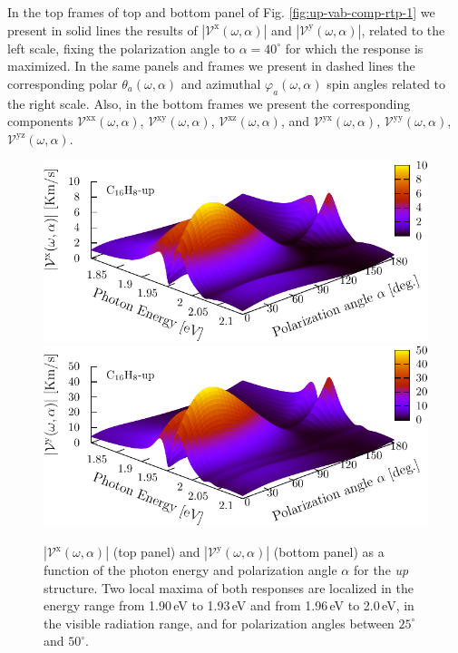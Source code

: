\documentclass[prb,11pt,tightenlines,twocolumn,aps]{revtex4-1}
\begin{document}
In the top frames of top and bottom panel of Fig. \ref{fig:up-vab-comp-rtp-1} we
present in solid lines the results of
$|\mathcal{V}^{\mathrm{x}}(\omega,\alpha)|$ and
$|\mathcal{V}^{\mathrm{y}}(\omega,\alpha)|$, related to the left scale, fixing
the polarization angle to $\alpha=40^{\circ}$ for which the response is
maximized. In the same panels and frames we present in dashed lines the
corresponding polar $\theta_{a}(\omega,\alpha)$ and azimuthal
$\varphi_{a}(\omega,\alpha)$ spin angles related to the right scale. Also, in
the bottom frames we present the corresponding components
$\mathcal{V}^{\mathrm{xx}}(\omega,\alpha)$,
$\mathcal{V}^{\mathrm{xy}}(\omega,\alpha)$,
$\mathcal{V}^{\mathrm{xz}}(\omega,\alpha)$, and
$\mathcal{V}^{\mathrm{yx}}(\omega,\alpha)$,
$\mathcal{V}^{\mathrm{yy}}(\omega,\alpha)$,
$\mathcal{V}^{\mathrm{yz}}(\omega,\alpha)$.
\begin{figure}[t]
    \centering
    \includegraphics[width=\linewidth]{upplots/up-3d-vxb-2}
    \\
    \includegraphics[width=\linewidth]{upplots/up-3d-vyb-2}
    
    \caption{$|\mathcal{V}^{\mathrm{x}}(\omega,\alpha)|$ (top panel) and
    $|\mathcal{V}^{\mathrm{y}}(\omega,\alpha)|$ (bottom panel)  as a function of
    the photon energy and polarization angle $\alpha$ for the \emph{up}
    structure. Two local maxima of both responses are localized in the energy
    range from 1.90\,eV to 1.93\,eV and from 1.96\,eV to 2.0\,eV, in the visible
    radiation range, and for polarization angles between $25^{\circ}$ and
    $50^{\circ}$.}
    \label{fig:up-3d-vva-2}
\end{figure}
\end{document}
